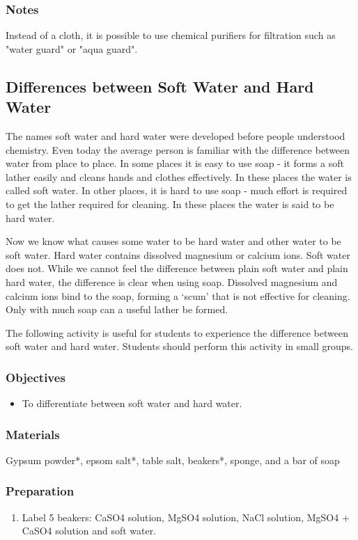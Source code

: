 \subsubsection*{Notes}
Instead of a cloth, it is possible to use chemical purifiers for filtration such as "water guard" or "aqua guard".

\subsection{Differences between Soft Water and Hard Water}

The names soft water and hard water were developed before people understood chemistry. Even today the average person is familiar with the difference between water from place to place. In some places it is easy to use soap - it forms a soft lather easily and cleans hands and clothes effectively. In these places the water is called soft water. In other places, it is hard to use soap - much effort is required to get the lather required for cleaning. In these places the water is said to be hard water.

Now we know what causes some water to be hard water and other water to be soft water. Hard water contains dissolved magnesium or calcium ions. Soft water does not. While we cannot feel the difference between plain soft water and plain hard water, the difference is clear when using soap. Dissolved magnesium and calcium ions bind to the soap, forming a `scum' that is not effective for cleaning. Only with much soap can a useful lather be formed.

The following activity is useful for students to experience the difference between soft water and hard water. Students should perform this activity in small groups.

\subsubsection*{Objectives}
\begin{itemize}
\item{To differentiate between soft water and hard water.}
\end{itemize}

\subsubsection*{Materials}
Gypsum powder*, epsom salt*, table salt, beakers*, sponge, and a bar of soap

\subsubsection*{Preparation}
\begin{enumerate}
\item{Label 5 beakers: CaSO4 solution, MgSO4 solution, NaCl solution, MgSO4 + CaSO4 solution and soft water.}
\end{enumerate}


